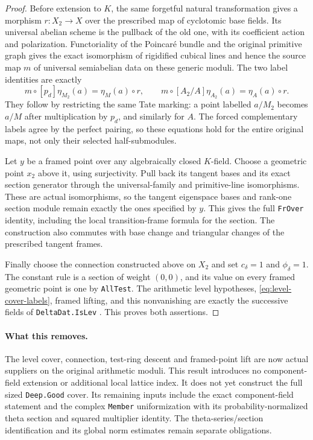 \begin{proof}
Before extension to $K$, the same forgetful natural transformation
gives a morphism $r:X_2\to X$ over the prescribed map of cyclotomic
base fields.  Its universal abelian scheme is the pullback of the
old one, with its coefficient action and polarization.  Functoriality
of the Poincar\'e bundle and the original primitive graph gives the
exact isomorphism of rigidified cubical lines and hence the source
map $m$ of universal semiabelian data on these generic moduli.
The two label identities are exactly
\begin{equation}\label{eq:level-cover-labels}
 m\circ[p_d]\eta_{M_2}(a)=\eta_M(a)\circ r,
 \qquad
 m\circ[A_2/A]\eta_{A_2}(a)=\eta_A(a)\circ r.
\end{equation}
They follow by restricting the same Tate marking: a point labelled
$a/M_2$ becomes $a/M$ after multiplication by $p_d$, and similarly
for $A$.  The forced complementary labels agree by the perfect
pairing, so these equations hold for the entire original maps,
not only their selected half-submodules.

Let $y$ be a framed point over any algebraically closed $K$-field.
Choose a geometric point $x_2$ above it, using surjectivity.  Pull
back its tangent bases and its exact section generator through the
universal-family and primitive-line isomorphisms.  These are actual
isomorphisms, so the tangent eigenspace bases and rank-one section
module remain exactly the ones specified by $y$.  This gives the
full \texttt{FrOver} identity, including the local transition-frame
formula for the section.  The construction also commutes with base
change and triangular changes of the prescribed tangent frames.

Finally choose the connection constructed above on $X_2$ and set
$c_\delta=1$ and $\phi_\delta=1$.  The constant rule is a section
of weight $(0,0)$, and its value on every framed geometric point
is one by \texttt{AllTest}.  The arithmetic level hypotheses,
\eqref{eq:level-cover-labels}, framed lifting, and this nonvanishing
are exactly the successive fields of \texttt{DeltaDat.IsLev}
\cite{level-cover-source}.  This proves both assertions.
\end{proof}

\paragraph{What this removes.}
The level cover, connection, test-ring descent and framed-point lift
are now actual suppliers on the original arithmetic moduli.  This
result introduces no component-field extension or additional local
lattice index.  It does not yet construct the full sized
\texttt{Deep.Good} cover.  Its remaining inputs include the exact
component-field statement and the complex \texttt{Member}
uniformization with its probability-normalized theta section and
squared multiplier identity.  The theta-series/section identification
and its global norm estimates remain separate obligations.
